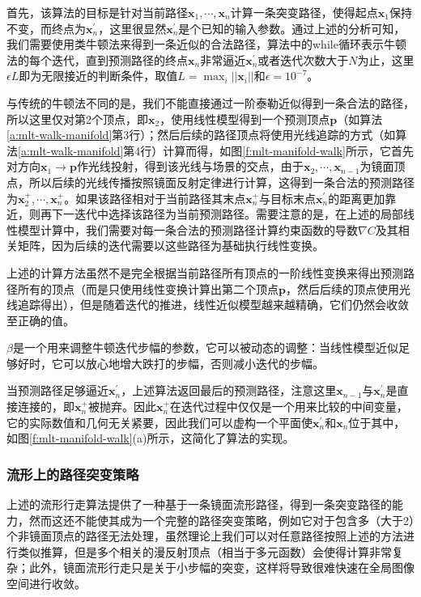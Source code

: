 首先，该算法的目标是针对当前路径$\mathbf{x}_1,\cdots,\mathbf{x}_n$计算一条突变路径，使得起点$\mathbf{x}_1$保持不变，而终点为$\mathbf{x}^{'}_n$，这里很显然$\mathbf{x}^{'}_n$是个已知的输入参数。通过上述的分析可知，我们需要使用类牛顿法来得到一条近似的合法路径，算法中的while循环表示牛顿法的每个迭代，直到预测路径的终点$\mathbf{x}_n$非常逼近$\mathbf{x}^{'}_n$或者迭代次数大于$N$为止，这里$\epsilon L$即为无限接近的判断条件，取值$L=\max_i||\mathbf{x}_i||$和$\epsilon=10^{-7}$。

与传统的牛顿法不同的是，我们不能直接通过一阶泰勒近似得到一条合法的路径，所以这里仅对第2个顶点，即$\mathbf{x}_2$，使用线性模型得到一个预测顶点$\mathbf{p}$（如算法\ref{a:mlt-walk-manifold}第3行）；然后后续的路径顶点将使用光线追踪的方式（如算法\ref{a:mlt-walk-manifold}第4行）计算而得，如图\ref{f:mlt-manifold-walk}所示，它首先对方向$\mathbf{x}_1\to\mathbf{p}$作光线投射，得到该光线与场景的交点，由于$\mathbf{x}_2,\cdots,\mathbf{x}_{n-1}$为镜面顶点，所以后续的光线传播按照镜面反射定律进行计算，这得到一条合法的预测路径为$\mathbf{x}^{+}_2,\cdots,\mathbf{x}^{+}_n$。如果该路径相对于当前路径其末点$\mathbf{x}^{+}_n$与目标末点$\mathbf{x}^{'}_n$的距离更加靠近，则再下一迭代中选择该路径为当前预测路径。需要注意的是，在上述的局部线性模型计算中，我们需要对每一条合法的预测路径计算约束函数的导数$\nabla C$及其相关矩阵，因为后续的迭代需要以这些路径为基础执行线性变换。

上述的计算方法虽然不是完全根据当前路径所有顶点的一阶线性变换来得出预测路径所有的顶点（而是只使用线性变换计算出第二个顶点$\mathbf{p}$，然后后续的顶点使用光线追踪得出），但是随着迭代的推进，线性近似模型越来越精确，它们仍然会收敛至正确的值。

$\beta$是一个用来调整牛顿迭代步幅的参数，它可以被动态的调整：当线性模型近似足够好时，它可以放心地增大跌打的步幅，否则减小迭代的步幅。

当预测路径足够逼近$\mathbf{x}^{'}_n$，上述算法返回最后的预测路径，注意这里$\mathbf{x}_{n-1}$与$\mathbf{x}^{'}_n$是直接连接的，即$\mathbf{x}^{+}_n$被抛弃。因此$\mathbf{x}^{+}_n$在迭代过程中仅仅是一个用来比较的中间变量，它的实际数值和几何无关紧要，因此我们可以虚构一个平面使$\mathbf{x}^{'}_n$和$\mathbf{x}_n$位于其中，如图\ref{f:mlt-manifold-walk}(a)所示，这简化了算法的实现。





\subsubsection{流形上的路径突变策略}\label{sec:mlt-manifold-perturbation}
上述的流形行走算法提供了一种基于一条镜面流形路径，得到一条突变路径的能力，然而这还不能使其成为一个完整的路径突变策略，例如它对于包含多（大于2）个非镜面顶点的路径无法处理，虽然理论上我们可以对任意路径按照上述的方法进行类似推算，但是多个相关的漫反射顶点（相当于多元函数）会使得计算非常复杂；此外，镜面流形行走只是关于小步幅的突变，这样将导致很难快速在全局图像空间进行收敛。


